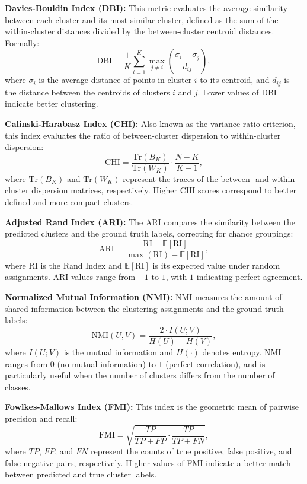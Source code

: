 \textbf{Davies-Bouldin Index (DBI):} This metric evaluates the average similarity between each
cluster and its most similar cluster, defined as the sum of the within-cluster distances divided
by the between-cluster centroid distances. Formally:
\begin{equation}
    \text{DBI} = \frac{1}{K} \sum_{i=1}^{K} \max_{j \ne i} \left( \frac{\sigma_i + \sigma_j}{d_{ij}} \right),
\end{equation}
where $\sigma_i$ is the average distance of points in cluster $i$ to its
centroid, and $d_{ij}$ is the distance between the centroids of clusters $i$
and $j$. Lower values of DBI indicate better clustering.

\textbf{Calinski-Harabasz Index (CHI):} Also known as the variance ratio criterion,
this index evaluates the ratio of between-cluster dispersion to within-cluster dispersion:
\begin{equation}
    \text{CHI} = \frac{\text{Tr}(B_K)}{\text{Tr}(W_K)} \cdot \frac{N - K}{K - 1},
\end{equation}
where $\text{Tr}(B_K)$ and $\text{Tr}(W_K)$ represent the traces of the
between- and within-cluster dispersion matrices, respectively. Higher CHI
scores correspond to better defined and more compact clusters.

\textbf{Adjusted Rand Index (ARI):} The ARI compares the similarity between the predicted clusters
and the ground truth labels, correcting for chance groupings:
\begin{equation}
    \text{ARI} = \frac{\text{RI} - \mathbb{E}[\text{RI}]}{\max(\text{RI}) - \mathbb{E}[\text{RI}]},
\end{equation}
where $\text{RI}$ is the Rand Index and $\mathbb{E}[\text{RI}]$ is its expected
value under random assignments. ARI values range from $-1$ to $1$, with $1$
indicating perfect agreement.

\textbf{Normalized Mutual Information (NMI):} NMI measures the amount of shared information
between the clustering assignments and the ground truth labels:
\begin{equation}
    \text{NMI}(U, V) = \frac{2 \cdot I(U; V)}{H(U) + H(V)},
\end{equation}
where $I(U; V)$ is the mutual information and $H(\cdot)$ denotes entropy. NMI
ranges from $0$ (no mutual information) to $1$ (perfect correlation), and is
particularly useful when the number of clusters differs from the number of
classes.

\textbf{Fowlkes-Mallows Index (FMI):} This index is the geometric mean of pairwise precision and recall:
\begin{equation}
    \text{FMI} = \sqrt{\frac{TP}{TP + FP} \cdot \frac{TP}{TP + FN}},
\end{equation}
where $TP$, $FP$, and $FN$ represent the counts of true positive, false
positive, and false negative pairs, respectively. Higher values of FMI indicate
a better match between predicted and true cluster labels.

